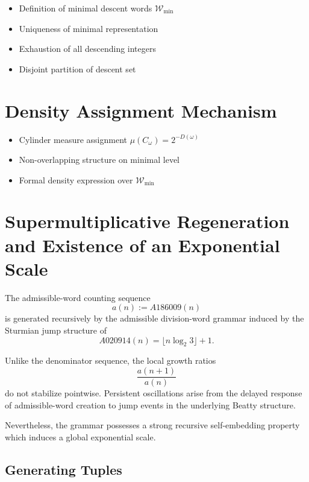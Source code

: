 \documentclass[12pt, oneside]{article}
\numberwithin{equation}{section}
\theoremstyle{definition}
\theoremstyle{plain}
\theoremstyle{remark}
\begin{document}
\begin{itemize}
    \item Definition of minimal descent words $\mathcal{W}_{\min}$
    \item Uniqueness of minimal representation
    \item Exhaustion of all descending integers
    \item Disjoint partition of descent set
\end{itemize}

\section{Density Assignment Mechanism}
\label{sec:8a-density}

\begin{itemize}
    \item Cylinder measure assignment $\mu(C_\omega) = 2^{-D(\omega)}$
    \item Non-overlapping structure on minimal level
    \item Formal density expression over $\mathcal{W}_{\min}$
\end{itemize}

\section{Supermultiplicative Regeneration and Existence of an Exponential Scale}
\label{sec:supermultiplicative-regeneration}

The admissible-word counting sequence
\[
a(n):=A186009(n)
\]
is generated recursively by the admissible division-word grammar induced by
the Sturmian jump structure of
\[
A020914(n)=\lfloor n\log_2 3\rfloor+1.
\]

Unlike the denominator sequence, the local growth ratios
\[
\frac{a(n+1)}{a(n)}
\]
do not stabilize pointwise.  Persistent oscillations arise from the delayed
response of admissible-word creation to jump events in the underlying Beatty
structure.

Nevertheless, the grammar possesses a strong recursive self-embedding property
which induces a global exponential scale.

\subsection{Generating Tuples}
\end{document}
